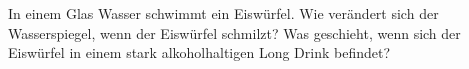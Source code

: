 In einem Glas Wasser schwimmt ein Eiswürfel. Wie verändert sich der Wasserspiegel, wenn der Eiswürfel schmilzt? Was geschieht, wenn sich der Eiswürfel in einem stark alkoholhaltigen Long Drink befindet?
